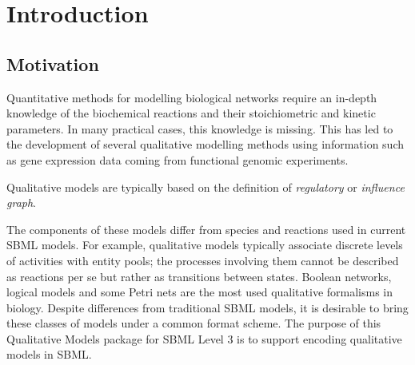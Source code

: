 
\section{Introduction}
\label{intro}

\subsection{Motivation}
Quantitative methods for modelling biological networks require an in-depth knowledge of the biochemical reactions and their stoichiometric and kinetic parameters. In many practical cases, this knowledge is missing. This has led to the development of several qualitative modelling methods using information such as gene expression data coming from functional genomic experiments. 

Qualitative models are typically based on the definition of \emph{regulatory} or \emph{influence graph}. 


The components of these models differ from species and reactions used in current SBML models. For example, qualitative models typically associate discrete levels of activities with entity pools; the processes involving them cannot be described as reactions per se but rather as transitions between states. Boolean networks, logical models and some Petri nets are the most used qualitative formalisms in biology. Despite differences from traditional SBML models, it is desirable to bring these classes of models under a common format scheme. The purpose of this Qualitative Models package for SBML Level 3 is to support encoding qualitative models in SBML.



